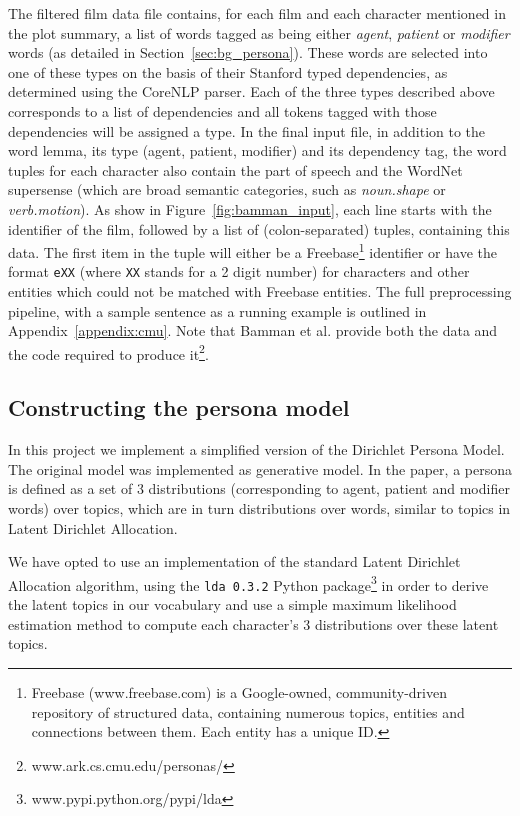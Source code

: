 \documentclass[bsc,frontabs,singlespacing,parskip, twoside]{infthesis}
\begin{document}
The filtered film data file contains, for each film and each character mentioned in the plot summary, a list of words tagged as being either \textit{agent}, \textit{patient} or \textit{modifier} words (as detailed in Section~\ref{sec:bg_persona}). These words are selected into one of these types on the basis of their Stanford typed dependencies, as determined using the CoreNLP parser. Each of the three types described above corresponds to a list of dependencies and all tokens tagged with those dependencies will be assigned a type. In the final input file, in addition to the word lemma, its type (agent, patient, modifier) and its dependency tag, the word tuples for each character also contain the part of speech and the WordNet supersense (which are broad semantic categories, such as \textit{noun.shape} or \textit{verb.motion}). As show in Figure~\ref{fig:bamman_input}, each line starts with the identifier of the film, followed by a list of (colon-separated) tuples, containing this data. The first item in the tuple will either be a Freebase\footnote{Freebase (www.freebase.com) is a Google-owned, community-driven repository of structured data, containing numerous topics, entities and connections between them. Each entity has a unique ID.} identifier or have the format \texttt{eXX} (where \texttt{XX} stands for a 2 digit number) for characters and other entities which could not be matched with Freebase entities. The full preprocessing pipeline, with a sample sentence as a running example is outlined in Appendix~\ref{appendix:cmu}. Note that Bamman et al. provide both the data and the code required to produce it\footnote{www.ark.cs.cmu.edu/personas/}.


\subsection{Constructing the persona model}
In this project we implement a simplified version of the Dirichlet Persona Model. The original model was implemented as generative model. In the paper, a persona is defined as a set of 3 distributions (corresponding to agent, patient and modifier words) over topics, which are in turn distributions over words, similar to topics in Latent Dirichlet Allocation.

We have opted to use an implementation of the standard Latent Dirichlet Allocation \cite{Blei2003} algorithm, using the \texttt{lda 0.3.2} Python package\footnote{ www.pypi.python.org/pypi/lda} in order to derive the latent topics in our vocabulary and use a simple maximum likelihood estimation method to compute each character's 3 distributions over these latent topics.
\end{document}

